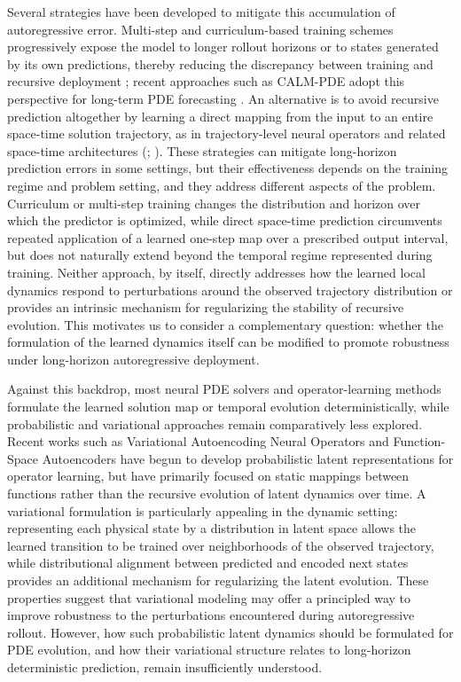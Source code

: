 \documentclass[11pt]{article}
\begin{document}
Several strategies have been developed to mitigate this accumulation of autoregressive error. Multi-step and curriculum-based training schemes progressively expose the model to longer rollout horizons or to states generated by its own predictions, thereby reducing the discrepancy between training and recursive deployment \citep{li2022transformer}; recent approaches such as CALM-PDE adopt this perspective for long-term PDE forecasting \citep{hagnberger2025calm}. An alternative is to avoid recursive prediction altogether by learning a direct mapping from the input to an entire space-time solution trajectory, as in trajectory-level neural operators and related space-time architectures (\citealp{li2020fourier}; \citealp{li2022transformer}). These strategies can mitigate long-horizon prediction errors in some settings, but their effectiveness depends on the training regime and problem setting, and they address different aspects of the problem. Curriculum or multi-step training changes the distribution and horizon over which the predictor is optimized, while direct space-time prediction circumvents repeated application of a learned one-step map over a prescribed output interval, but does not naturally extend beyond the temporal regime represented during training. Neither approach, by itself, directly addresses how the learned local dynamics respond to perturbations around the observed trajectory distribution or provides an intrinsic mechanism for regularizing the stability of recursive evolution. This motivates us to consider a complementary question: whether the formulation of the learned dynamics itself can be modified to promote robustness under long-horizon autoregressive deployment.

Against this backdrop, most neural PDE solvers and operator-learning methods formulate the learned solution map or temporal evolution deterministically, while probabilistic and variational approaches remain comparatively less explored. Recent works such as Variational Autoencoding Neural Operators \citep{seidman2023variational} and Function-Space Autoencoders \citep{bunker2025autoencoders} have begun to develop probabilistic latent representations for operator learning, but have primarily focused on static mappings between functions rather than the recursive evolution of latent dynamics over time. A variational formulation is particularly appealing in the dynamic setting: representing each physical state by a distribution in latent space allows the learned transition to be trained over neighborhoods of the observed trajectory, while distributional alignment between predicted and encoded next states provides an additional mechanism for regularizing the latent evolution. These properties suggest that variational modeling may offer a principled way to improve robustness to the perturbations encountered during autoregressive rollout. However, how such probabilistic latent dynamics should be formulated for PDE evolution, and how their variational structure relates to long-horizon deterministic prediction, remain insufficiently understood.
\end{document}
